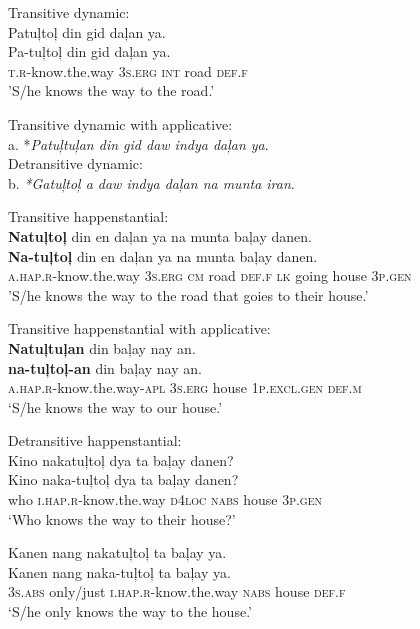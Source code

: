 \ea
Transitive dynamic: \\
Patuļtoļ	din	gid	daļan	ya. \\\smallskip
\gll Pa-tuļtoļ	din	gid	daļan	ya. \\
\textsc{t.r}-know.the.way	3\textsc{s.erg}	\textsc{int}	road	\textsc{def.f} \\
\glt ’S/he knows the way to the road.’
\z 

\ea
Transitive dynamic with applicative: \\
a. *\textit{Patuļtuļan din gid daw indya daļan ya}. \\\smallskip
Detransitive dynamic: \\
b. \textit{*Gatuļtoļ a daw indya daļan na munta iran}. \\
\z

\ea
Transitive happenstantial: \\
\textbf{Natuļtoļ}	din	en	daļan	ya	na	munta 	baļay	danen. \\\smallskip
\gll \textbf{Na-tuļtoļ}	din	en	daļan	ya	na	munta 	baļay	danen. \\
\textsc{a.hap.r}-know.the.way	3\textsc{s.erg}	\textsc{cm}	road	\textsc{def.f}	\textsc{lk}	going	house	3\textsc{p.gen} \\
\glt ’S/he knows the way to the road that goies to their house.’
\z

\ea
Transitive happenstantial with applicative: \\
\textbf{Natuļtuļan}	din	baļay	nay	an. \\\smallskip
\gll \textbf{na-tuļtoļ-an}	din	baļay	nay	an. \\
\textsc{a.hap.r}-know.the.way-\textsc{apl} 3\textsc{s.erg} house	1\textsc{p.excl.gen}	\textsc{def.m} \\
\glt ‘S/he knows the way to our house.’
\z

\ea
Detransitive happenstantial: \\
Kino	nakatuļtoļ	dya	ta	baļay	danen? \\\smallskip
\gll Kino	naka-tuļtoļ	dya	ta	baļay	danen? \\
who		\textsc{i.hap.r}-know.the.way	\textsc{d4loc}	\textsc{nabs}	house	3\textsc{p.gen} \\
\glt ‘Who knows the way to their house?’
\z

\ea
Kanen	nang	nakatuļtoļ	ta	baļay	ya. \\\smallskip
\gll Kanen	nang	naka-tuļtoļ	ta	baļay	ya. \\
3\textsc{s.abs}	only/just	\textsc{i.hap.r}-know.the.way	\textsc{nabs}	house	\textsc{def.f} \\
\glt ‘S/he only knows the way to the house.’
\z

